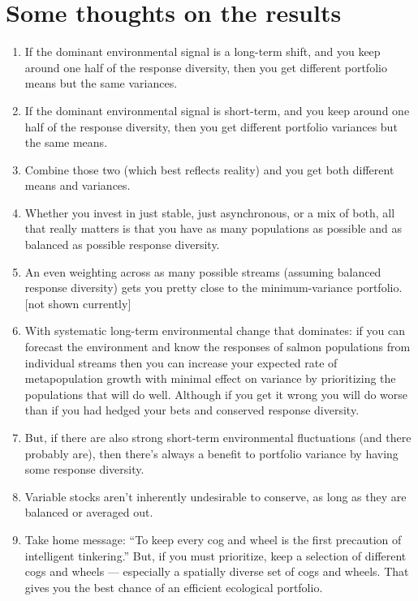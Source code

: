 \documentclass[12pt]{article}
\begin{document}
\clearpage

\section{Some thoughts on the results}

\begin{enumerate}
\def\labelenumi{\arabic{enumi}.}
\itemsep1pt\parskip0pt
\item
  If the dominant environmental signal is a long-term shift, and you
  keep around one half of the response diversity, then you get different
  portfolio means but the same variances.
\item
  If the dominant environmental signal is short-term, and you keep
  around one half of the response diversity, then you get different
  portfolio variances but the same means.
\item
  Combine those two (which best reflects reality) and you get both
  different means and variances.
\item
  Whether you invest in just stable, just asynchronous, or a mix of
  both, all that really matters is that you have as many populations as
  possible and as balanced as possible response diversity.
\item
  An even weighting across as many possible streams (assuming balanced
  response diversity) gets you pretty close to the minimum-variance
  portfolio. {[}not shown currently{]}
\item
  With systematic long-term environmental change that dominates: if you
  can forecast the environment and know the responses of salmon
  populations from individual streams then you can increase your
  expected rate of metapopulation growth with minimal effect on variance
  by prioritizing the populations that will do well. Although if you get
  it wrong you will do worse than if you had hedged your bets and
  conserved response diversity.
\item
  But, if there are also strong short-term environmental fluctuations
  (and there probably are), then there's always a benefit to portfolio
  variance by having some response diversity.
\item
  Variable stocks aren't inherently undesirable to conserve, as long as
  they are balanced or averaged out.
\item
  Take home message: ``To keep every cog and wheel is the first
  precaution of intelligent tinkering.'' But, if you must prioritize,
  keep a selection of different cogs and wheels --- especially a
  spatially diverse set of cogs and wheels. That gives you the best
  chance of an efficient ecological portfolio.
\end{enumerate}
\end{document}
